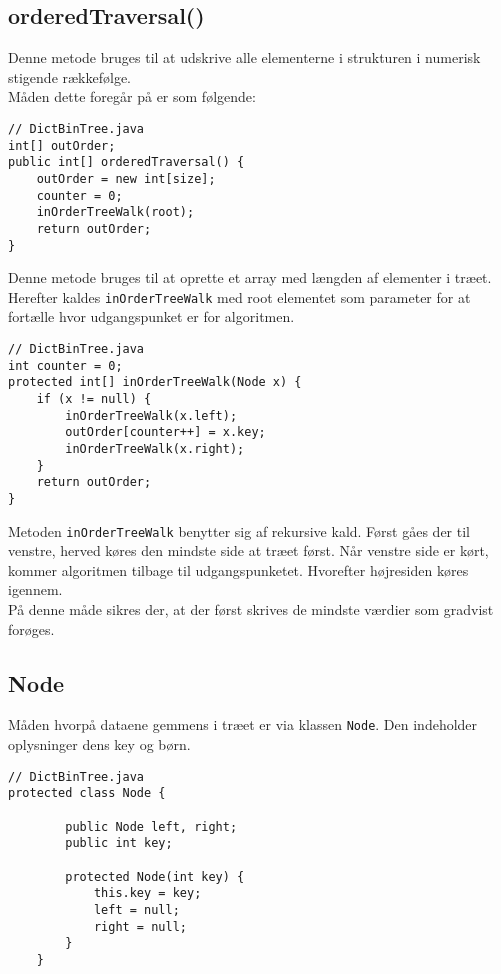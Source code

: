 \documentclass{article}
\begin{document}
\subsection*{orderedTraversal()}
Denne metode bruges til at udskrive alle elementerne i strukturen i numerisk stigende rækkefølge.\\
Måden dette foregår på er som følgende:
\begin{lstlisting}
// DictBinTree.java
int[] outOrder;
public int[] orderedTraversal() {
    outOrder = new int[size];
    counter = 0;
    inOrderTreeWalk(root);
    return outOrder;
}
\end{lstlisting}
\bigskip
Denne metode bruges til at oprette et array med længden af elementer i træet. Herefter kaldes \texttt{inOrderTreeWalk} med root elementet som parameter for at fortælle hvor udgangspunket er for algoritmen.
\begin{lstlisting}
// DictBinTree.java
int counter = 0;
protected int[] inOrderTreeWalk(Node x) {
	if (x != null) {
		inOrderTreeWalk(x.left);
		outOrder[counter++] = x.key;
		inOrderTreeWalk(x.right);
	}
	return outOrder;
}
\end{lstlisting}
\bigskip
Metoden \texttt{inOrderTreeWalk} benytter sig af rekursive kald. Først gåes der til venstre, herved køres den mindste side at træet først. Når venstre side er kørt, kommer algoritmen tilbage til udgangspunketet. Hvorefter højresiden køres igennem.\\
På denne måde sikres der, at der først skrives de mindste værdier som gradvist forøges. 
\newpage
\subsection*{Node}
Måden hvorpå dataene gemmens i træet er via klassen \texttt{Node}. Den indeholder oplysninger dens key og børn.
\begin{lstlisting}
// DictBinTree.java
protected class Node {

        public Node left, right;
        public int key;
        
        protected Node(int key) {
            this.key = key;
            left = null;
            right = null;
        }
    }
\end{lstlisting}
\bigskip
\newpage
\end{document}
